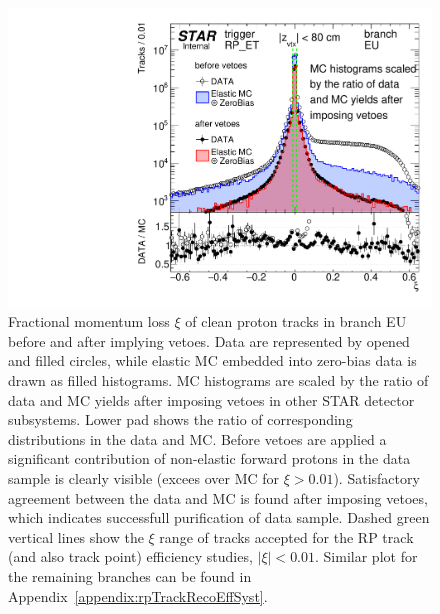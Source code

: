 \begin{figure}[t!]%
	\centering
	\parbox{0.4725\textwidth}{%
		\centering%
		\includegraphics[width=\linewidth,page=1]{graphics/systematicsEfficiency/RpSyst/xiPerBranch.pdf}%
	} 
	\quad
	\parbox{0.4725\textwidth}{ 
		\centering
			\caption[Fractional momentum loss $\xi$ of clean proton tracks before and after implying vetoes in the data and MC (branch EU).]%
			{Fractional momentum loss $\xi$ of clean proton tracks in branch EU before and after implying vetoes. Data are represented by opened and filled circles, while elastic MC embedded into zero-bias data is drawn as filled histograms. MC histograms are scaled by the ratio of data and MC yields after imposing vetoes in other STAR detector subsystems. Lower pad shows the ratio of corresponding distributions in the data and MC. Before vetoes are applied a significant contribution of non-elastic forward protons in the data sample is clearly visible (excees over MC for $\xi>0.01$). Satisfactory agreement between the data and MC is found after imposing vetoes, which indicates successfull purification of data sample. Dashed green vertical lines show the $\xi$ range of tracks accepted for the RP track (and also track point) efficiency studies, $|\xi|<0.01$. Similar plot for the remaining branches can be found in Appendix~\ref{appendix:rpTrackRecoEffSyst}.}\label{fig:rpSystXi_EU}%
	}
	
\end{figure}


